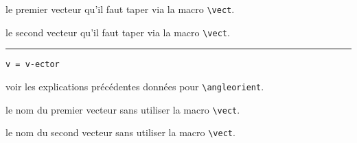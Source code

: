 \documentclass[12pt,a4paper]{article}
\theoremstyle{definition}
\newcommand\env[1]{\texttt{#1}}
\newcommand\macro[1]{\env{\textbackslash{}#1}}
\newcommand\separation{
    \medskip
    \hfill\rule{0.5\textwidth}{0.75pt}\hfill
    \medskip
}
\newcommand\mwhyprefix[2]{%
    \texttt{#1 = #1-#2}%
}
\begin{document}
 le premier vecteur qu'il faut taper via la macro \macro{vect}.

 le second vecteur qu'il faut taper via la macro \macro{vect}.


\separation


 \hfill \mwhyprefix{v}{ector}

\IDoption{} voir les explications précédentes données pour \macro{angleorient}.

 le nom du premier vecteur sans utiliser la macro \macro{vect}.

 le nom du second vecteur sans utiliser la macro \macro{vect}.
\end{document}
